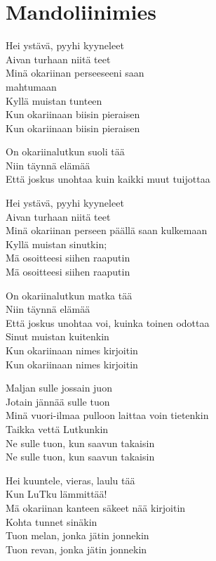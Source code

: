 \section{Mandoliinimies}
Hei ystävä, pyyhi kyyneleet\\
Aivan turhaan niitä teet\\
Minä okariinan perseeseeni saan\\
mahtumaan\\
Kyllä muistan tunteen\\
Kun okariinaan biisin pieraisen\\
Kun okariinaan biisin pieraisen

On okariinalutkun suoli tää\\
Niin täynnä elämää\\
Että joskus unohtaa kuin kaikki muut tuijottaa

Hei ystävä, pyyhi kyyneleet\\
Aivan turhaan niitä teet\\
Minä okariinan perseen päällä saan kulkemaan\\
Kyllä muistan sinutkin;\\
Mä osoitteesi siihen raaputin\\
Mä osoitteesi siihen raaputin

On okariinalutkun matka tää\\
Niin täynnä elämää\\
Että joskus unohtaa voi, kuinka toinen odottaa\\
Sinut muistan kuitenkin\\
Kun okariinaan nimes kirjoitin\\
Kun okariinaan nimes kirjoitin

Maljan sulle jossain juon\\
Jotain jännää sulle tuon\\
Minä vuori-ilmaa pulloon laittaa voin tietenkin\\
Taikka vettä Lutkunkin\\
Ne sulle tuon, kun saavun takaisin\\
Ne sulle tuon, kun saavun takaisin

Hei kuuntele, vieras, laulu tää\\
Kun LuTku lämmittää!\\
Mä okariinan kanteen säkeet nää kirjoitin\\
Kohta tunnet sinäkin\\
Tuon melan, jonka jätin jonnekin\\
Tuon revan, jonka jätin jonnekin

